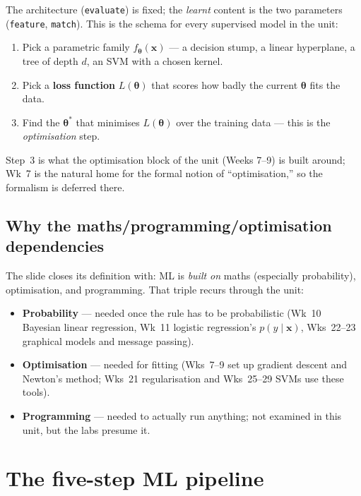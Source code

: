 \documentclass[11pt, a4paper]{article}
\begin{document}
The architecture (\texttt{evaluate}) is fixed; the \emph{learnt} content is the two parameters (\texttt{feature}, \texttt{match}). This is the schema for every supervised model in the unit:

\begin{enumerate}
  \item Pick a parametric family $f_{\boldsymbol\theta}(\mathbf{x})$ — a decision stump, a linear hyperplane, a tree of depth $d$, an SVM with a chosen kernel.
  \item Pick a \textbf{loss function} $L(\boldsymbol\theta)$ that scores how badly the current $\boldsymbol\theta$ fits the data.
  \item Find the $\boldsymbol\theta^*$ that minimises $L(\boldsymbol\theta)$ over the training data — this is the \emph{optimisation} step.
\end{enumerate}

Step~3 is what the optimisation block of the unit (Weeks 7--9) is built around; Wk~7 is the natural home for the formal notion of ``optimisation,'' so the formalism is deferred there.

\subsection{Why the maths/programming/optimisation dependencies}

The slide closes its definition with: ML is \emph{built on} maths (especially probability), optimisation, and programming. That triple recurs through the unit:

\begin{itemize}
  \item \textbf{Probability} — needed once the rule has to be probabilistic (Wk~10 Bayesian linear regression, Wk~11 logistic regression's $p(y\mid \mathbf{x})$, Wks~22--23 graphical models and message passing).
  \item \textbf{Optimisation} — needed for fitting (Wks~7--9 set up gradient descent and Newton's method; Wks~21 regularisation and Wks~25--29 SVMs use these tools).
  \item \textbf{Programming} — needed to actually run anything; not examined in this unit, but the labs presume it.
\end{itemize}

\section{The five-step ML pipeline}
\end{document}
